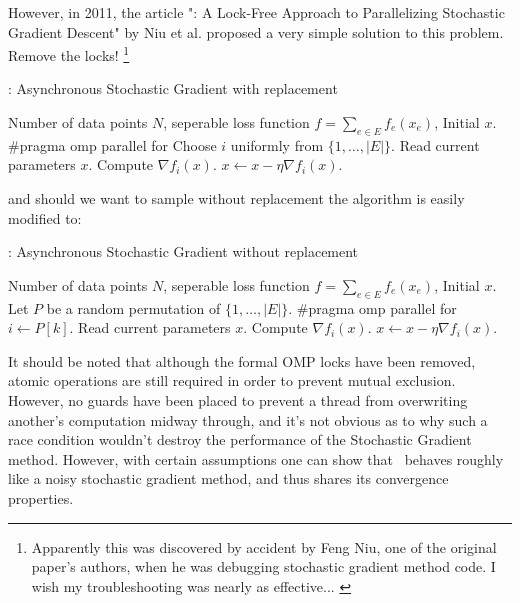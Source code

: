 However, in 2011, the article "\hogwild: A Lock-Free Approach to Parallelizing
Stochastic Gradient Descent" by Niu et al. \cite{2011NRRW} proposed a very
simple solution to this problem. Remove the locks!%
\footnote{
  Apparently this was discovered by accident by Feng Niu, one of the original
  paper's authors, when he was debugging stochastic gradient method code. I wish
  my troubleshooting was nearly as effective... \cite{2014Recht}
}
\begin{breakablealgorithm}
  \caption{\hogwild: Asynchronous Stochastic Gradient with replacement}
  \label{alg:hogwildwreplacement}
  \begin{algorithmic}[1]
    \Require Number of data points $N$, seperable loss function $f
    = \sum_{e \in E} f_e(x_e)$, Initial $x$.
      \State \#pragma omp parallel for
        \State Choose $i$ uniformly from $\{1, \dots, |E|\}$.
        \State Read current parameters $x$.
        \State Compute $\nabla f_i(x)$.
        \State $x \gets x - \eta \nabla f_i(x)$. 
      \EndFor
    \EndFor
  \end{algorithmic}
\end{breakablealgorithm}
and should we want to sample without replacement the algorithm is easily
modified to:
\begin{breakablealgorithm}
  \caption{\hogwild: Asynchronous Stochastic Gradient without replacement}
  \label{alg:hogwildworeplacement}
  \begin{algorithmic}[1]
    \Require Number of data points $N$, seperable loss function $f
    = \sum_{e \in E} f_e(x_e)$, Initial $x$.
      \State Let $P$ be a random permutation of $\{1, \dots, |E|\}$.
      \State \#pragma omp parallel for
        \State $i \gets P[k]$.
        \State Read current parameters $x$.
        \State Compute $\nabla f_i(x)$.
        \State $x \gets x - \eta \nabla f_i(x)$. 
      \EndFor
    \EndFor
  \end{algorithmic}
\end{breakablealgorithm}

It should be noted that although the formal OMP locks have been removed, atomic
operations are still required in order to prevent mutual exclusion. However, no
guards have been placed to prevent a thread from overwriting another's
computation midway through, and it's not obvious as to why such a race condition
wouldn't destroy the performance of the Stochastic Gradient method. However,
with certain assumptions one can show that \hogwild\ behaves roughly like a noisy
stochastic gradient method, and thus shares its convergence properties.
